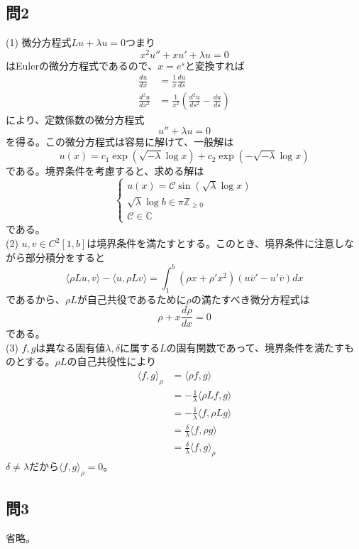 \documentclass{jsarticle}
\begin{document}
\subsection*{問2}
(1) 微分方程式$Lu + \lambda u=0$つまり
$$
x^2u'' +xu' +\lambda u = 0
$$
はEulerの微分方程式であるので、$x=e^s$と変換すれば
\begin{align*}
  \frac{du}{dx} &= \frac{1}{x}\frac{du}{ds} \\
  \frac{d^2u}{dx^2} &= \frac{1}{x^2} \left( \frac{d^2u}{ds^2}   - \frac{du}{ds} \right)
\end{align*}
により、定数係数の微分方程式
$$
u'' + \lambda u = 0
$$
を得る。この微分方程式は容易に解けて、一般解は
$$
u(x) =c_1 \exp(\sqrt{-\lambda}\log x) + c_2 \exp(-\sqrt{-\lambda}\log x)
$$
である。境界条件を考慮すると、求める解は
$$
\begin{cases}
  u(x) = \mathcal{C} \sin (\sqrt{\lambda} \log x) \\
  \sqrt{\lambda} \log b \in \pi \mathbb{Z}_{ \geq 0} \\
  \mathcal{C} \in \mathbb{C}
\end{cases}
$$
である。\\

(2) $u,v \in C^2[1,b]$は境界条件を満たすとする。このとき、境界条件に注意しながら部分積分をすると
$$
\langle \rho L u, v \rangle - \langle u,\rho Lv \rangle =
\int_1^b (\rho x + \rho' x^2)(u\overline{v}' - u'\overline{v} )dx
$$
であるから、$\rho L$が自己共役であるために$\rho$の満たすべき微分方程式は
$$
\rho + x \frac{d\rho}{dx} = 0
$$
である。\\

(3) $f,g$は異なる固有値$\lambda,\delta$に属する$L$の固有関数であって、境界条件を満たすものとする。$\rho L$の自己共役性により
\begin{align*}
  \langle f,g \rangle_{\rho} &= \langle \rho f,g \rangle \\
  &= -\frac{1}{\lambda} \Big\langle \rho L f,g \Big\rangle \\
  &=  -\frac{1}{\lambda} \Big\langle  f,\rho Lg \Big\rangle
  \\
  &= \frac{\delta}{\lambda} \Big\langle  f,\rho g \Big\rangle \\
  &= \frac{\delta}{\lambda} \Big\langle  f, g \Big\rangle_{\rho}
\end{align*}
$\delta \neq \lambda$だから$\langle f,g \rangle_{\rho}=0$。

\subsection*{問3}
省略。
\end{document}
